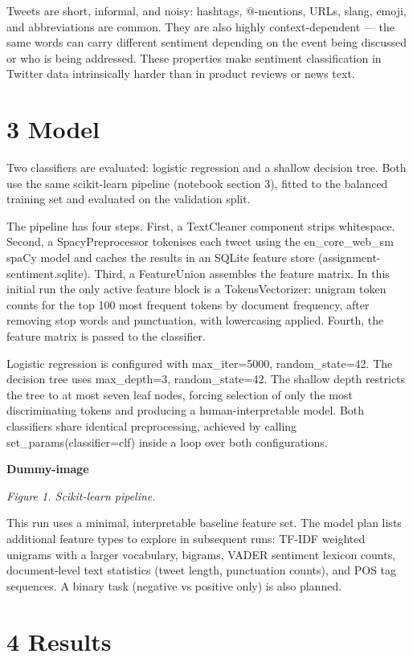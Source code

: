 \documentclass[
  12pt,
]{article}
\begin{document}
Tweets are short, informal, and noisy: hashtags, @-mentions, URLs,
slang, emoji, and abbreviations are common. They are also highly
context-dependent --- the same words can carry different sentiment
depending on the event being discussed or who is being addressed. These
properties make sentiment classification in Twitter data intrinsically
harder than in product reviews or news text.

\section{3 Model}\label{model}

Two classifiers are evaluated: logistic regression and a shallow
decision tree. Both use the same scikit-learn pipeline (notebook section
3), fitted to the balanced training set and evaluated on the validation
split.

The pipeline has four steps. First, a TextCleaner component strips
whitespace. Second, a SpacyPreprocessor tokenises each tweet using the
en\_core\_web\_sm spaCy model and caches the results in an SQLite
feature store (assignment-sentiment.sqlite). Third, a FeatureUnion
assembles the feature matrix. In this initial run the only active
feature block is a TokensVectorizer: unigram token counts for the top
100 most frequent tokens by document frequency, after removing stop
words and punctuation, with lowercasing applied. Fourth, the feature
matrix is passed to the classifier.

Logistic regression is configured with max\_iter=5000, random\_state=42.
The decision tree uses max\_depth=3, random\_state=42. The shallow depth
restricts the tree to at most seven leaf nodes, forcing selection of
only the most discriminating tokens and producing a human-interpretable
model. Both classifiers share identical preprocessing, achieved by
calling set\_params(classifier=clf) inside a loop over both
configurations.

\textbf{Dummy-image}

\emph{Figure 1. Scikit-learn pipeline.}

This run uses a minimal, interpretable baseline feature set. The model
plan lists additional feature types to explore in subsequent runs:
TF-IDF weighted unigrams with a larger vocabulary, bigrams, VADER
sentiment lexicon counts, document-level text statistics (tweet length,
punctuation counts), and POS tag sequences. A binary task (negative vs
positive only) is also planned.

\section{4 Results}\label{results}
\end{document}
